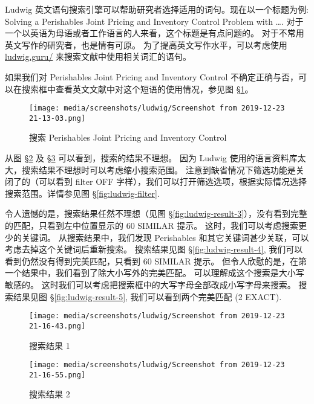 \documentclass[
    11pt,
    cite=authoryear,
    device=phone,
    lang=cn,
    mode=simple,
    result=answer,
    toc=onecol,
]{elegantbook_sierxue}
\begin{document}
Ludwig 英文语句搜索引擎可以帮助研究者选择适用的词句。现在以一个标题为例:
Solving a Perishables Joint Pricing and Inventory Control Problem
with \ldots.
对于一个以英语为母语或者工作语言的人来看，这个标题是有点问题的。
对于不常用英文写作的研究者，也是情有可原。
为了提高英文写作水平，可以考虑使用
\href{https://ludwig.guru/}{ludwig.guru/} 来搜索文献中使用相关词汇的语句。

如果我们对 Perishables Joint Pricing and Inventory Control
不确定正确与否，可以在搜索框中查看英文文献中对这个短语的使用情况，参见图
\S\ref{fig:ludwig-search}。

\begin{figure}[!htbp]
  \centering
  \texttt{[image: media/screenshots/ludwig/Screenshot from
  2019-12-23 21-13-03.png]}
  \caption{搜索 Perishables Joint Pricing and Inventory Control}%
  \label{fig:ludwig-search}
\end{figure}

从图 \S\ref{fig:ludwig-result-1} 及 \S\ref{fig:ludwig-result-2}
可以看到，搜索的结果不理想。
因为 Ludwig 使用的语言资料库太大，搜索结果不理想时可以考虑缩小搜索范围。
注意到缺省情况下筛选功能是关闭了的（可以看到 filter OFF
字样），我们可以打开筛选选项，根据实际情况选择搜索范围。详情参见图
\S\ref{fig:ludwig-filter}.

令人遗憾的是，搜索结果任然不理想（见图
\S\ref{fig:ludwig-result-3}），没有看到完整的匹配，只看到左中位置显示的 60
SIMILAR 提示。
这时，我们可以考虑搜索更少的关键词。
从搜索结果中，我们发现 Perishables
和其它关键词甚少关联，可以考虑去掉这个关键词后重新搜索。
搜索结果见图 \S\ref{fig:ludwig-result-4},
我们可以看到仍然没有得到完美匹配，只看到 60 SIMILAR 提示。
但令人欣慰的是，在第一个结果中，我们看到了除大小写外的完美匹配。
可以理解成这个搜索是大小写敏感的。
这时我们可以考虑把搜索框中的大写字母全部改成小写字母来搜索。
搜索结果见图 \S\ref{fig:ludwig-result-5}, 我们可以看到两个完美匹配
(2 EXACT).

\begin{figure}[!htbp]
  \centering
  \texttt{[image: media/screenshots/ludwig/Screenshot from 2019-12-23 21-16-43.png]}
  \caption{搜索结果 1}%
  \label{fig:ludwig-result-1}
\end{figure}

\begin{figure}[!htbp]
  \centering
  \texttt{[image: media/screenshots/ludwig/Screenshot from 2019-12-23 21-16-55.png]}
  \caption{搜索结果 2}%
  \label{fig:ludwig-result-2}
\end{figure}
\end{document}
